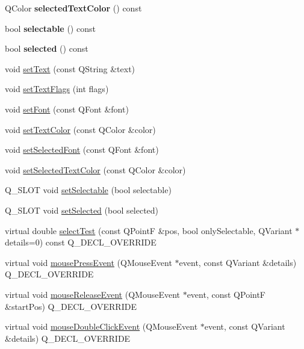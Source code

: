 \begin{DoxyCompactItemize}
\mbox{\label{classQCPTextElement_a98616fa5c33f1eaee0428191ece39686}} 
Q\+Color {\bfseries selected\+Text\+Color} () const
\item 
\mbox{\label{classQCPTextElement_a96e2a712fca40324a8489f75833b4096}} 
bool {\bfseries selectable} () const
\item 
\mbox{\label{classQCPTextElement_a135d1ad0aa97a245b4247c3292ff551c}} 
bool {\bfseries selected} () const
\item 
void \hyperlink{classQCPTextElement_ac44b81e69e719b879eb2feecb33557e2}{set\+Text} (const Q\+String \&text)
\item 
void \hyperlink{classQCPTextElement_ab908f437f552020888a3ad8cf8242605}{set\+Text\+Flags} (int flags)
\item 
void \hyperlink{classQCPTextElement_a09b3241769528fa87cb4bf35c97defad}{set\+Font} (const Q\+Font \&font)
\item 
void \hyperlink{classQCPTextElement_a4f3b8361c3ffb3f84346954929ce93ba}{set\+Text\+Color} (const Q\+Color \&color)
\item 
void \hyperlink{classQCPTextElement_a0a2397a3c4ede519e16ab3e991904065}{set\+Selected\+Font} (const Q\+Font \&font)
\item 
void \hyperlink{classQCPTextElement_abaec200cae70a0eade53583defc0476d}{set\+Selected\+Text\+Color} (const Q\+Color \&color)
\item 
Q\+\_\+\+S\+L\+OT void \hyperlink{classQCPTextElement_a3c5f9b1897a036b16495ed3fb8371c55}{set\+Selectable} (bool selectable)
\item 
Q\+\_\+\+S\+L\+OT void \hyperlink{classQCPTextElement_aba5521f9fb22a5f3d2f09ab37d4a1751}{set\+Selected} (bool selected)
\item 
virtual double \hyperlink{classQCPTextElement_a1e721bc2994a127ef5a8f0a514a5dbac}{select\+Test} (const Q\+PointF \&pos, bool only\+Selectable, Q\+Variant $\ast$details=0) const Q\+\_\+\+D\+E\+C\+L\+\_\+\+O\+V\+E\+R\+R\+I\+DE
\item 
virtual void \hyperlink{classQCPTextElement_ad7b2c98355e3d2f912574b74fcee0574}{mouse\+Press\+Event} (Q\+Mouse\+Event $\ast$event, const Q\+Variant \&details) Q\+\_\+\+D\+E\+C\+L\+\_\+\+O\+V\+E\+R\+R\+I\+DE
\item 
virtual void \hyperlink{classQCPTextElement_acfcbaf9b1da18745e72726aafb39c855}{mouse\+Release\+Event} (Q\+Mouse\+Event $\ast$event, const Q\+PointF \&start\+Pos) Q\+\_\+\+D\+E\+C\+L\+\_\+\+O\+V\+E\+R\+R\+I\+DE
\item 
virtual void \hyperlink{classQCPTextElement_a2272ff775ab385f612e9fd39773de7c0}{mouse\+Double\+Click\+Event} (Q\+Mouse\+Event $\ast$event, const Q\+Variant \&details) Q\+\_\+\+D\+E\+C\+L\+\_\+\+O\+V\+E\+R\+R\+I\+DE
\end{DoxyCompactItemize}
